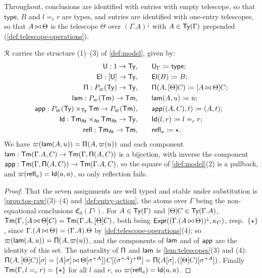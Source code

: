 Throughout, conclusions are identified with entries with empty telescope, so that $\mathsf{type}$, $B$ and $l =_c r$ are types, and entries are identified with one-entry telescopes, so that $A \mathbin{\bowtie} \Theta$ is the telescope $\Theta$ over $(\Gamma.A)^{\downarrow}$ with $A \in \mathsf{Ty}(\Gamma)$ prepended (\cref{def:telescope-operations}).

\begin{lemma}\label{lem:raw-structure}
    $\mathcal{R}$ carries the structure (1)--(3) of \cref{def:model}, given by:
    \begin{align*}
        \mathsf{U} : 1 \to \mathsf{Ty}, &\qquad \mathsf{U}_\Gamma \coloneqq \mathsf{type};\\
        \mathsf{El} : [\mathsf{U}] \to \mathsf{Ty}, &\qquad \mathsf{El}(B) \coloneqq B;\\
        \mathsf{\Pi} : P_\varpi(\mathsf{Ty}) \to \mathsf{Ty}, &\qquad \mathsf{\Pi}(A, [\Theta]C) \coloneqq [A \mathbin{\bowtie} \Theta]C;\\
        \mathsf{lam} : P_\varpi(\mathsf{Tm}) \to \mathsf{Tm}, &\qquad \mathsf{lam}(A, u) \coloneqq u;\\
        \mathsf{app} : P_\varpi(\mathsf{Ty}) \times_{\mathsf{Ty}} \mathsf{Tm} \to P_\varpi(\mathsf{Tm}), &\qquad \mathsf{app}((A, C), t) \coloneqq (A, t);\\
        \mathsf{Id} : \mathsf{Tm}_{\mathsf{At}} \times_{\mathsf{At}} \mathsf{Tm}_{\mathsf{At}} \to \mathsf{Ty}, &\qquad \mathsf{Id}(l, r) \coloneqq l =_c r;\\
        \mathsf{refl} : \mathsf{Tm}_{\mathsf{At}} \to \mathsf{Tm}, &\qquad \mathsf{refl}_a \coloneqq \star.
    \end{align*}
    We have $\varpi(\mathsf{lam}(A,u)) = \Pi(A,\varpi(u))$ and each component $\mathsf{lam} : \mathsf{Tm}(\Gamma.A, C) \to \mathsf{Tm}(\Gamma, \mathsf{\Pi}(A, C))$ is a bijection, with inverse the component $\mathsf{app} : \mathsf{Tm}(\Gamma, \mathsf{\Pi}(A, C)) \to \mathsf{Tm}(\Gamma.A, C)$, so the square of \cref{def:model}(2) is a pullback, and $\varpi(\mathsf{refl}_a) = \mathsf{Id}(a, a)$, so only reflection fails.
\end{lemma}

\begin{proof}
    That the seven assignments are well typed and stable under substitution is \cref{prop:tos-raw}(3)--(4) and \cref{def:entry-action}, the atoms over $\Gamma$ being the non-equational conclusions $\mathfrak{C}_0(\Gamma^{\downarrow})$. For $A \in \mathsf{Ty}(\Gamma)$ and $[\Theta]C \in \mathsf{Ty}(\Gamma.A)$, $\mathsf{Tm}(\Gamma, [A \mathbin{\bowtie} \Theta]C) = \mathsf{Tm}(\Gamma.A, [\Theta]C)$, both being $\mathsf{Expr}((\Gamma.(A \mathbin{\bowtie} \Theta))^{\downarrow}, \kappa_C)$, resp.\ $\{\star\}$, since $\Gamma.(A \mathbin{\bowtie} \Theta) = (\Gamma.A).\Theta$ by \cref{def:telescope-operations}(4); so $\varpi(\mathsf{lam}(A, u)) = \mathsf{\Pi}(A, \varpi(u))$, and the components of $\mathsf{lam}$ and of $\mathsf{app}$ are the identity of this set. The naturality of $\mathsf{\Pi}$ and $\mathsf{lam}$ is \cref{lem:telescopes}(3) and (4): $\mathsf{\Pi}(A, [\Theta]C)[\sigma] = [A[\sigma] \mathbin{\bowtie} \Theta[\sigma^{+A}]]\, C[(\sigma^{+A})^{+\Theta}] = \mathsf{\Pi}(A[\sigma], ([\Theta]C)[\sigma^{+A}])$. Finally $\mathsf{Tm}(\Gamma, l =_c r) = \{\star\}$ for all $l$ and $r$, so $\varpi(\mathsf{refl}_a) = \mathsf{Id}(a, a)$.
\end{proof}

